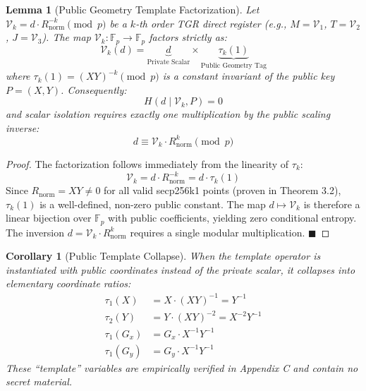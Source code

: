 \documentclass[11pt, a4paper, twoside]{book}
\newtheorem{lemma}[theorem]{Lemma}
\newtheorem{corollary}[theorem]{Corollary}
\begin{document}
\begin{lemma}[Public Geometry Template Factorization]
\label{lem:template_factorization}
Let $\mathcal{V}_k = d \cdot R_{\text{norm}}^{-k} \pmod p$ be a $k$-th order TGR direct register (e.g., $M = \mathcal{V}_1$, $T = \mathcal{V}_2$, $J = \mathcal{V}_3$). The map $\mathcal{V}_k : \mathbb{F}_p \to \mathbb{F}_p$ factors strictly as:
\begin{equation}
    \mathcal{V}_k(d) = \underbrace{d}_{\text{Private Scalar}} \times \underbrace{\tau_k(1)}_{\text{Public Geometry Tag}}
\end{equation}
where $\tau_k(1) = (XY)^{-k} \pmod p$ is a constant invariant of the public key $P = (X, Y)$. Consequently:
\begin{equation}
    H(d \mid \mathcal{V}_k, P) = 0
\end{equation}
and scalar isolation requires exactly one multiplication by the public scaling inverse:
\begin{equation}
    d \equiv \mathcal{V}_k \cdot R_{\text{norm}}^k \pmod p
\end{equation}
\end{lemma}

\begin{proof}
The factorization follows immediately from the linearity of $\tau_k$:
\begin{equation}
    \mathcal{V}_k = d \cdot R_{\text{norm}}^{-k} = d \cdot \tau_k(1)
\end{equation}
Since $R_{\text{norm}} = XY \neq 0$ for all valid secp256k1 points (proven in Theorem 3.2), $\tau_k(1)$ is a well-defined, non-zero public constant. The map $d \mapsto \mathcal{V}_k$ is therefore a linear bijection over $\mathbb{F}_p$ with public coefficients, yielding zero conditional entropy. The inversion $d = \mathcal{V}_k \cdot R_{\text{norm}}^k$ requires a single modular multiplication. $\blacksquare$
\end{proof}

\begin{corollary}[Public Template Collapse]
When the template operator is instantiated with public coordinates instead of the private scalar, it collapses into elementary coordinate ratios:
\begin{align}
    \tau_1(X) &= X \cdot (XY)^{-1} = Y^{-1} \\
    \tau_2(Y) &= Y \cdot (XY)^{-2} = X^{-2} Y^{-1} \\
    \tau_1(G_x) &= G_x \cdot X^{-1} Y^{-1} \\
    \tau_1(G_y) &= G_y \cdot X^{-1} Y^{-1}
\end{align}
These ``template'' variables are empirically verified in Appendix C and contain no secret material.
\end{corollary}
\end{document}
